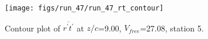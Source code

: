 \begin{figure}[H]
\centering
\texttt{[image: figs/run\_47/run\_47\_rt\_contour]}
\caption{Contour plot of $\overline{r^\prime t^\prime}$ at $z/c$=9.00, $V_{free}$=27.08, station 5.}
\end{figure}


